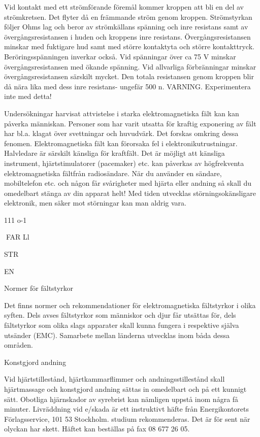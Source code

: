 Vid kontakt med ett strömförande föremål
kommer kroppen att bli en del av strömkretsen. Det flyter då en främmande ström genom kroppen.
Strömstyrkan följer Ohms lag och beror
av strömkällans spänning och inre resistans
samt av övergångsresistansen i huden och
kroppens inre resistans.
Övergångsresistansen minskar med fuktigare hud samt med större kontaktyta och
större kontakttryck. Beröringsspänningen inverkar också. Vid spänningar över ca 75 V
minskar övergångsresistansen med ökande
spänning. Vid allvarliga förbränningar minskar övergångsresistansen särskilt mycket.
Den totala resistansen genom kroppen blir
då nära lika med dess inre resistans- ungefär 500 n.
VARNING. Experimentera inte med detta!

Undersökningar harvisat attvistelse i starka
elektromagnetiska fält kan kan påverka människan. Personer som har varit utsatta för
kraftig exponering av fält har bl.a. klagat över
svettningar och huvudvärk. Det forskas omkring dessa fenomen.
Elektromagnetiska fält kan förorsaka fel
i elektronikutrustningar. Halvledare är särskilt känsliga för kraftfält. Det är möjligt att
känsliga instrument, hjärtstimulatorer (pacemaker) etc. kan påverkas av högfrekventa
elektromagnetiska fältfrån radiosändare. När
du använder en sändare, mobiltelefon etc.
och någon får svårigheter med hjärta eller
andning så skall du omedelbart stänga av
din apparat helt! Med tiden utvecklas störningsokänsligare elektronik, men säker mot
störningar kan man aldrig vara.

111 o-1

FAR Ll

STR

EN

Normer för fältstyrkor

Det finns normer och rekommendationer för
elektromagnetiska fältstyrkor i olika syften.
Dels avses fältstyrkor som människor
och djur får utsättas för, dels fältstyrkor som
olika slags apparater skall kunna fungera i
respektive själva utsänder (EMC).
Samarbete mellan länderna utvecklas
inom båda dessa områden.

Konstgjord andning

Vid hjärtstillestånd, hjärtkammarflimmer och
andningsstillestånd skall hjärtmassage och
konstgjord andning sättas in omedelbart och
på ett kunnigt sätt. Obotliga hjärnskador av
syrebrist kan nämligen uppstå inom några få
minuter.
Livräddning vid e/skada är ett instruktivt
häfte från Energikontorets Förlagsservice,
101 53 Stockholm. studium rekommenderas.
Det är för sent när olyckan har skett. Häftet
kan beställas på fax 08 677 26 05.

